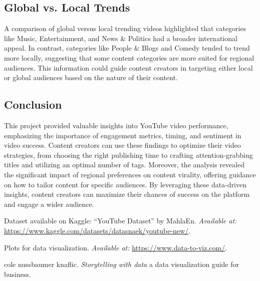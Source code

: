 \documentclass[a4paper]{article}
\begin{document}
\begin{multicols}{2}
\subsection{Global vs. Local Trends}
A comparison of global versus local trending videos highlighted that categories like Music, Entertainment, and News \& Politics had a broader international appeal. In contrast, categories like People \& Blogs and Comedy tended to trend more locally, suggesting that some content categories are more suited for regional audiences. This information could guide content creators in targeting either local or global audiences based on the nature of their content.

\subsection{Conclusion}
This project provided valuable insights into YouTube video performance, emphasizing the importance of engagement metrics, timing, and sentiment in video success. Content creators can use these findings to optimize their video strategies, from choosing the right publishing time to crafting attention-grabbing titles and utilizing an optimal number of tags. Moreover, the analysis revealed the significant impact of regional preferences on content virality, offering guidance on how to tailor content for specific audiences. By leveraging these data-driven insights, content creators can maximize their chances of success on the platform and engage a wider audience.




\begin{thebibliography}{9}

Dataset available on Kaggle: ``YouTube Dataset'' by MahlaEn. \textit{Available at:} \url{https://www.kaggle.com/datasets/datasnaek/youtube-new/}.

Plots for data visualization. \textit{Available at:} \url{https://www.data-to-viz.com/}.


cole nussbaumer knaflic. \textit{Storytelling with data } a data visualization guide for business.

\end{thebibliography}

\end{multicols}
\end{document}
